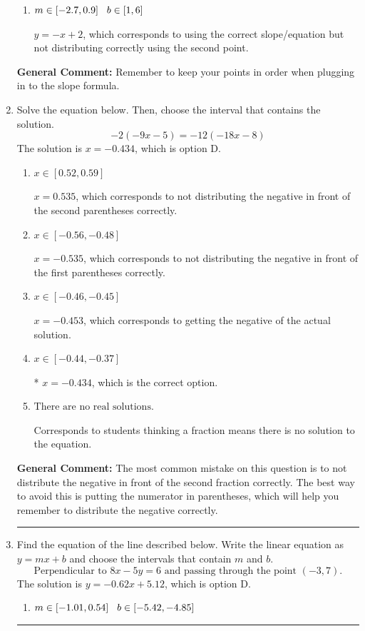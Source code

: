 \documentclass{extbook}[14pt]
\newcommand{\litem}[1]{\item #1

\rule{\textwidth}{0.4pt}}
\begin{document}
\begin{enumerate}
{\begin{enumerate}[label=\Alph*.]
 $y = x + 2.0$, which corresponds to using the negative slope and the correct equation.
\item \( m \in [-2.7, 0.9] \hspace*{3mm} b \in [1, 6] \)

 $y = -x + 2$, which corresponds to using the correct slope/equation but not distributing correctly using the second point.
\end{enumerate}

\textbf{General Comment:} Remember to keep your points in order when plugging in to the slope formula.
}
\litem{
Solve the equation below. Then, choose the interval that contains the solution.
\[ -2(-9x -5) = -12(-18x -8) \]
The solution is \( x = -0.434 \), which is option D.\begin{enumerate}[label=\Alph*.]
\item \( x \in [0.52, 0.59] \)

$x = 0.535$, which corresponds to not distributing the negative in front of the second parentheses correctly.
\item \( x \in [-0.56, -0.48] \)

$x = -0.535$, which corresponds to not distributing the negative in front of the first parentheses correctly.
\item \( x \in [-0.46, -0.45] \)

$x = -0.453$, which corresponds to getting the negative of the actual solution.
\item \( x \in [-0.44, -0.37] \)

* $x = -0.434$, which is the correct option.
\item \( \text{There are no real solutions.} \)

Corresponds to students thinking a fraction means there is no solution to the equation.
\end{enumerate}

\textbf{General Comment:} The most common mistake on this question is to not distribute the negative in front of the second fraction correctly. The best way to avoid this is putting the numerator in parentheses, which will help you remember to distribute the negative correctly.
}
\litem{
Find the equation of the line described below. Write the linear equation as $ y=mx+b $ and choose the intervals that contain $m$ and $b$.
\[ \text{Perpendicular to } 8 x - 5 y = 6 \text{ and passing through the point } (-3, 7). \]
The solution is \( y = -0.62x + 5.12 \), which is option D.\begin{enumerate}[label=\Alph*.]
\item \( m \in [-1.01, 0.54] \hspace*{3mm} b \in [-5.42, -4.85] \)


\end{enumerate}}
\end{enumerate}
\end{document}
